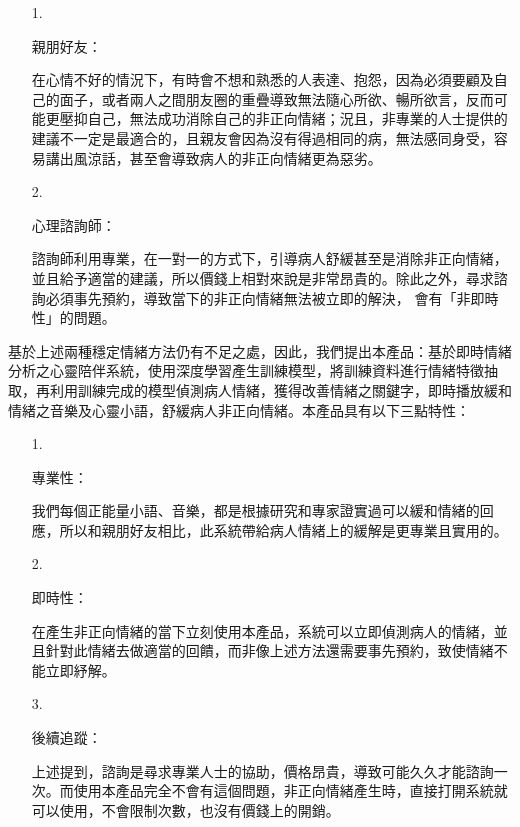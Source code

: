 \documentclass[12pt]{scrreprt}
\begin{document}
\begin{itemize}
\item[1.]{\begin{bfseries}親朋好友：\end{bfseries}}

在心情不好的情況下，有時會不想和熟悉的人表達、抱怨，因為必須要顧及自己的面子，或者兩人之間朋友圈的重疊導致無法隨心所欲、暢所欲言，反而可能更壓抑自己，無法成功消除自己的非正向情緒；況且，非專業的人士提供的建議不一定是最適合的，且親友會因為沒有得過相同的病，無法感同身受，容易講出風涼話，甚至會導致病人的非正向情緒更為惡劣。

\item[2.]{\begin{bfseries}心理諮詢師：\end{bfseries}}

諮詢師利用專業，在一對一的方式下，引導病人舒緩甚至是消除非正向情緒，並且給予適當的建議，所以價錢上相對來說是非常昂貴的。除此之外，尋求諮詢必須事先預約，導致當下的非正向情緒無法被立即的解決， 會有「非即時性」的問題。

\end{itemize}

基於上述兩種穩定情緒方法仍有不足之處，因此，我們提出本產品：基於即時情緒分析之心靈陪伴系統，使用深度學習產生訓練模型，將訓練資料進行情緒特徵抽取，再利用訓練完成的模型偵測病人情緒，獲得改善情緒之關鍵字，即時播放緩和情緒之音樂及心靈小語，舒緩病人非正向情緒。本產品具有以下三點特性：
\begin{itemize}
\item[1.]{\begin{bfseries}專業性：\end{bfseries}}我們每個正能量小語、音樂，都是根據研究和專家證實過可以緩和情緒的回應，所以和親朋好友相比，此系統帶給病人情緒上的緩解是更專業且實用的。


\item[2.]{\begin{bfseries}即時性：\end{bfseries}}在產生非正向情緒的當下立刻使用本產品，系統可以立即偵測病人的情緒，並且針對此情緒去做適當的回饋，而非像上述方法還需要事先預約，致使情緒不能立即紓解。


\item[3.] {\begin{bfseries}後續追蹤：\end{bfseries}}上述提到，諮詢是尋求專業人士的協助，價格昂貴，導致可能久久才能諮詢一次。而使用本產品完全不會有這個問題，非正向情緒產生時，直接打開系統就可以使用，不會限制次數，也沒有價錢上的開銷。
\end{itemize}
\end{document}
